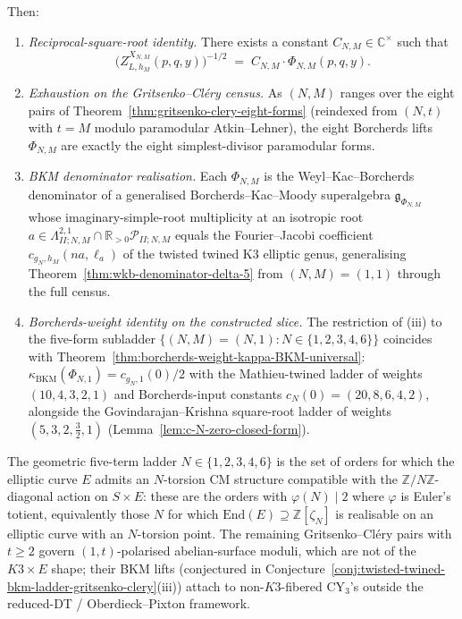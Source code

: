 \begin{conjecture}
Then:
\begin{enumerate}[label=(\roman*), leftmargin=2em, itemsep=0.3ex]
\item \emph{Reciprocal-square-root identity.} There exists a constant
$C_{N, M} \in \mathbb{C}^\times$ such that
\[
 \bigl( Z^{X_{N,M}}_{L, h_M}(p, q, y) \bigr)^{-1/2}
 \;=\; C_{N, M} \cdot \Phi_{N, M}(p, q, y).
\]
\item \emph{Exhaustion on the Gritsenko--Cl\'ery census.} As $(N, M)$
ranges over the eight pairs of
Theorem~\ref{thm:gritsenko-clery-eight-forms} (reindexed from $(N, t)$
with $t = M$ modulo paramodular Atkin--Lehner), the eight Borcherds
lifts $\Phi_{N, M}$ are exactly the eight simplest-divisor paramodular
forms.
\item \emph{BKM denominator realisation.} Each $\Phi_{N, M}$ is the
Weyl--Kac--Borcherds denominator of a generalised Borcherds--Kac--Moody
superalgebra $\mathfrak{g}_{\Phi_{N, M}}$ whose imaginary-simple-root
multiplicity at an isotropic root
$a \in \Lambda^{2, 1}_{II; N, M} \cap \mathbb{R}_{>0} \mathcal{P}_{II; N, M}$
equals the Fourier--Jacobi coefficient $c_{g_N, h_M}(n a, \ell_a)$ of
the twisted twined K3 elliptic genus, generalising
Theorem~\ref{thm:wkb-denominator-delta-5} from $(N, M) = (1, 1)$ through
the full census.
\item \emph{Borcherds-weight identity on the constructed slice.}
The restriction of (iii) to the five-form subladder
$\{(N, M) = (N, 1) : N \in \{1, 2, 3, 4, 6\}\}$ coincides with
Theorem~\ref{thm:borcherds-weight-kappa-BKM-universal}:
$\kappa_{\mathrm{BKM}}(\Phi_{N, 1}) = c_{g_N, 1}(0) / 2$ with the
Mathieu-twined ladder of weights $(10, 4, 3, 2, 1)$ and
Borcherds-input constants $c_N(0) = (20, 8, 6, 4, 2)$, alongside the
Govindarajan--Krishna square-root ladder of weights
$(5, 3, 2, \tfrac32, 1)$
(Lemma~\ref{lem:c-N-zero-closed-form}).
\end{enumerate}
\end{conjecture}

\begin{remark}
\label{rem:cm-stability-5-of-8}
The geometric five-term ladder $N \in \{1, 2, 3, 4, 6\}$ is the set
of orders for which the elliptic curve $E$ admits an $N$-torsion CM
structure compatible with the $\mathbb{Z}/N\mathbb{Z}$-diagonal action
on $S \times E$: these are the orders with $\varphi(N) \mid 2$ where
$\varphi$ is Euler's totient, equivalently those $N$ for which
$\mathrm{End}(E) \supseteq \mathbb{Z}[\zeta_N]$ is realisable on an
elliptic curve with an $N$-torsion point. The remaining
Gritsenko--Cl\'ery pairs with $t \geq 2$ govern $(1, t)$-polarised
abelian-surface moduli, which are not of the $K3 \times E$ shape;
their BKM lifts (conjectured in
Conjecture~\ref{conj:twisted-twined-bkm-ladder-gritsenko-clery}(iii))
attach to non-$K3$-fibered CY$_3$'s outside the reduced-DT /
Oberdieck--Pixton framework.
\end{remark}

